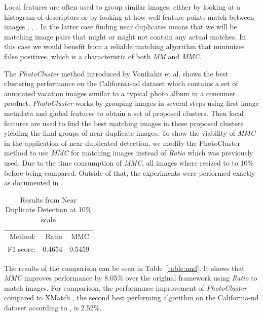Local features are often used to group similar images, either by looking
at a histogram of descriptors \cite{wu2009bundling} or by looking at how
well feature points match between images \cite{zhao2009scale},
\cite{chu2010consumer}, \cite{vas2013cluster}. In the latter case 
finding near duplicates means that we will be matching image pairs that 
might or might not contain any actual matches. In this case we would 
benefit from a reliable matching algorithm that minimizes false 
positives, which is a characteristic of both \emph{MM} and \emph{MMC}.

The \emph{PhotoCluster} method introduced by Vonikakis et al.  
\cite{vas2013cluster} shows the best clustering performance on the 
California-nd dataset \cite{jinda2012california} which contains a set of
annotated vacation images similar to a typical photo album in a consumer
product. \emph{PhotoCluster} works by grouping images in several steps 
using first image metadata and global features to obtain a set of 
proposed clusters. Then local features are used to find the best 
matching images in these proposed clusters yielding the final groups of 
near duplicate images. To show the viability of \emph{MMC} in the 
application of near duplicated detection, we modify the PhotoCluster 
method to use \emph{MMC} for matching images instead of \emph{Ratio} 
which was previously used. Due to the time consumption of \emph{MMC}, 
all images where resized to to 10\% before being compared. Outside of 
that, the experiments were performed exactly as documented in 
\cite{vas2013cluster}.

\begin{table}[htb]
\caption{Results from Near Duplicate Detection at 10\% scale}
\label{table:ndd}
	\centering
\begin{tabular}{r*{2}{r}}
\hline
    Method: & Ratio & MMC   \\
	\noalign{\smallskip}
    F1 score: & 0.4654 & 0.5459 \\
	\hline
\end{tabular}
\end{table}

The results of the comparison can be seen in Table~\ref{table:nnd}. It 
shows that \emph{MMC} improves performance by 8.05\% over the original 
framework using \emph{Ratio} to match images. For comparison, the 
performance improvement of \emph{PhotoCluster} compared to XMatch 
\cite{zhao2009scale}, the second best performing algorithm on the 
California-nd dataset according to \cite{vas2013cluster}, is 2.52\%.

